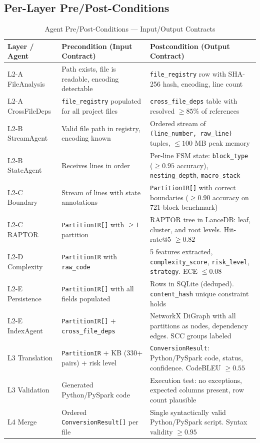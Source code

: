 \documentclass[11pt,a4paper]{article}
\begin{document}
\subsection{Per-Layer Pre/Post-Conditions}

\begin{table}[H]
\centering
\caption{Agent Pre/Post-Conditions — Input/Output Contracts}
\renewcommand{\arraystretch}{1.3}
\small
\begin{tabularx}{\textwidth}{@{} l L{4.5cm} L{4.5cm} @{}}
\toprule
\textbf{Layer / Agent} & \textbf{Precondition (Input Contract)} & \textbf{Postcondition (Output Contract)} \\
\midrule
L2-A FileAnalysis & Path exists, file is readable, encoding detectable & \texttt{file\_registry} row with SHA-256 hash, encoding, line count \\
L2-A CrossFileDeps & \texttt{file\_registry} populated for all project files & \texttt{cross\_file\_deps} table with resolved $\geq 85\%$ of references \\
L2-B StreamAgent & Valid file path in registry, encoding known & Ordered stream of \texttt{(line\_number, raw\_line)} tuples, $\leq 100$ MB peak memory \\
L2-B StateAgent & Receives lines in order & Per-line FSM state: \texttt{block\_type} ($\geq 0.95$ accuracy), \texttt{nesting\_depth}, \texttt{macro\_stack} \\
L2-C Boundary & Stream of lines with state annotations & \texttt{PartitionIR[]} with correct boundaries ($\geq 0.90$ accuracy on 721-block benchmark) \\
L2-C RAPTOR & \texttt{PartitionIR[]} with $\geq 1$ partition & RAPTOR tree in LanceDB: leaf, cluster, and root levels. Hit-rate@5 $\geq 0.82$ \\
L2-D Complexity & \texttt{PartitionIR} with \texttt{raw\_code} & 5 features extracted, \texttt{complexity\_score}, \texttt{risk\_level}, \texttt{strategy}. ECE $\leq 0.08$ \\
L2-E Persistence & \texttt{PartitionIR[]} with all fields populated & Rows in SQLite (deduped). \texttt{content\_hash} unique constraint holds \\
L2-E IndexAgent & \texttt{PartitionIR[]} $+$ \texttt{cross\_file\_deps} & NetworkX DiGraph with all partitions as nodes, dependency edges. SCC groups labeled \\
L3 Translation & \texttt{PartitionIR} $+$ KB (330+ pairs) $+$ risk level & \texttt{ConversionResult}: Python/PySpark code, status, confidence. CodeBLEU $\geq 0.55$ \\
L3 Validation & Generated Python/PySpark code & Execution test: no exceptions, expected columns present, row count plausible \\
L4 Merge & Ordered \texttt{ConversionResult[]} per file & Single syntactically valid Python/PySpark script. Syntax validity $\geq 0.95$ \\
\bottomrule
\end{tabularx}
\end{table}
\end{document}
